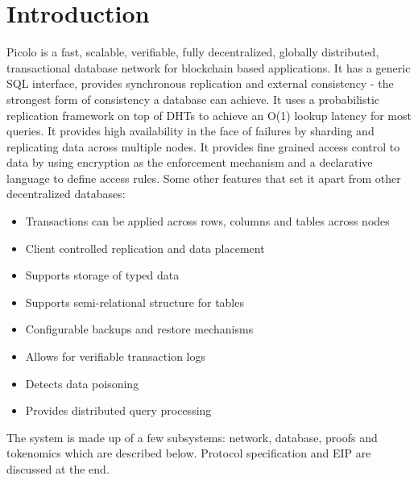 \documentclass[preprint,12pt]{elsarticle}
\begin{document}
\section{Introduction}\label{Sect:Introduction}
Picolo is a fast, scalable, verifiable, fully decentralized, globally distributed, transactional database network for
blockchain based applications. It has a generic SQL interface, provides synchronous replication and external consistency - the strongest form of consistency a database can achieve. It uses a probabilistic replication framework on top of DHTs to achieve an O(1) lookup latency for most queries. It provides high availability in the face of failures by sharding and replicating data across multiple nodes. It provides fine grained access control to data by using encryption as the enforcement mechanism and a declarative language to define access rules. Some other features that set it apart from other decentralized databases:
\begin{itemize}
    \item Transactions can be applied across rows, columns and tables across nodes
    \item Client controlled replication and data placement
    \item Supports storage of typed data
    \item Supports semi-relational structure for tables
    \item Configurable backups and restore mechanisms
   	\item Allows for verifiable transaction logs
   	\item Detects data poisoning
   	\item Provides distributed query processing
\end{itemize}
The system is made up of a few subsystems: network, database, proofs and tokenomics which are described below. Protocol specification and EIP are discussed at the end.

\end{document}
